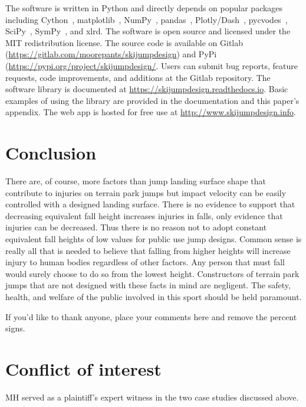 \documentclass[smallextended]{svjour3}       %
\begin{document}
The software is written in Python and directly depends on popular packages
including Cython~\cite{Behnel2011}, matplotlib~\cite{Hunter2007},
NumPy~\cite{Oliphant2006}, pandas~\cite{McKinney2020},
Plotly/Dash~\cite{Plotly2015}, pycvodes~\cite{Dahlgren2018},
SciPy~\cite{Virtanen2020}, SymPy~\cite{Meurer2017}, and xlrd. The software is
open source and licensed under the MIT redistribution license. The source code
is available on Gitlab (\url{https://gitlab.com/moorepants/skijumpdesign}) and
PyPi (\url{https://pypi.org/project/skijumpdesign/}. Users can submit bug
reports, feature requests, code improvements, and additions at the Gitlab
repository. The software library is documented at
\url{https://skijumpdesign.readthedocs.io}. Basic examples of using the library
are provided in the documentation and this paper's appendix. The web app is
hosted for free use at \url{http://www.skijumpdesign.info}.

\section{Conclusion}
\label{sec:conc}
%
There are, of course, more factors than jump landing surface shape that
contribute to injuries on terrain park jumps but impact velocity can be easily
controlled with a designed landing surface. There is no evidence to support
that decreasing equivalent fall height increases injuries in falls, only
evidence that injuries can be decreased. Thus there is no reason not to adopt
constant equivalent fall heights of low values for public use jump designs.
Common sense is really all that is needed to believe that falling from higher
heights will increase injury to human bodies regardless of other factors. Any
person that must fall would surely choose to do so from the lowest height.
Constructors of terrain park jumps that are not designed with these facts in
mind are negligent. The safety, health, and welfare of the public involved in
this sport should be held paramount.

\begin{acknowledgements}
If you'd like to thank anyone, place your comments here
and remove the percent signs.
\end{acknowledgements}

%
\section*{Conflict of interest}
\label{sec:conflict}
%
MH served as a plaintiff's expert witness in the two case studies discussed above.
\end{document}
